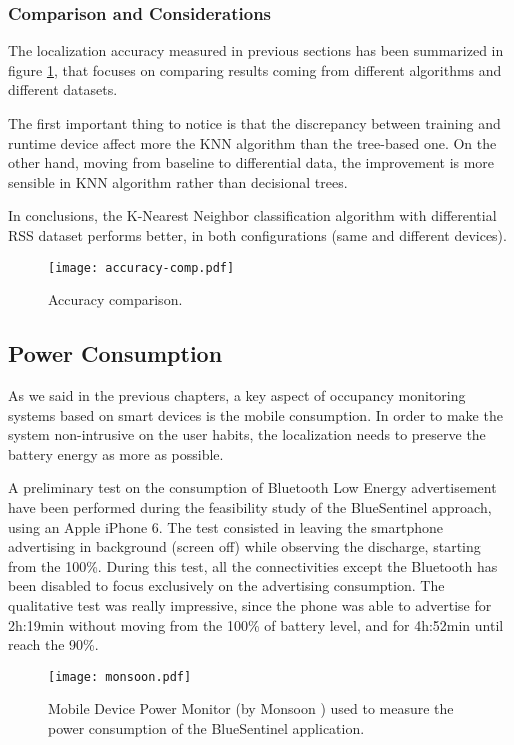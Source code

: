 \subsubsection{Comparison and Considerations}
\label{sec:accuracy-comp}
The localization accuracy measured in previous sections has been summarized in figure \ref{fig:accuracy-comp}, that focuses on comparing results coming from different algorithms and different datasets.

The first important thing to notice is that the discrepancy between training and runtime device affect more the KNN algorithm than the tree-based one. On the other hand, moving from baseline to differential data, the improvement is more sensible in KNN algorithm rather than decisional trees.

In conclusions, the K-Nearest Neighbor classification algorithm with differential RSS dataset performs better, in both configurations (same and different devices).


\begin{figure}[h!tb]
\centering\texttt{[image: accuracy-comp.pdf]}
\caption{Accuracy comparison.}
\label{fig:accuracy-comp}
\end{figure}

\subsection{Power Consumption}
\label{sec:test-consumption}

As we said in the previous chapters, a key aspect of occupancy monitoring systems based on smart devices is the mobile consumption. In order to make the system non-intrusive on the user habits, the localization needs to preserve the battery energy as more as possible.

A preliminary test on the consumption of Bluetooth Low Energy advertisement have been performed during the feasibility study of the BlueSentinel approach, using an Apple iPhone 6. The test consisted in leaving the smartphone advertising in background (screen off) while observing the discharge, starting from the 100\%. During this test, all the connectivities except the Bluetooth has been disabled to focus exclusively on the advertising consumption. The qualitative test was really impressive, since the phone was able to advertise for 2h:19min without moving from the 100\% of battery level, and for 4h:52min until reach the 90\%.
\smallskip

\begin{figure}[h!tb]
\centering\texttt{[image: monsoon.pdf]}
\caption{Mobile Device Power Monitor (by Monsoon \textregistered) used to measure the power consumption of the BlueSentinel application.}
\label{fig:monsoon}
\end{figure}

